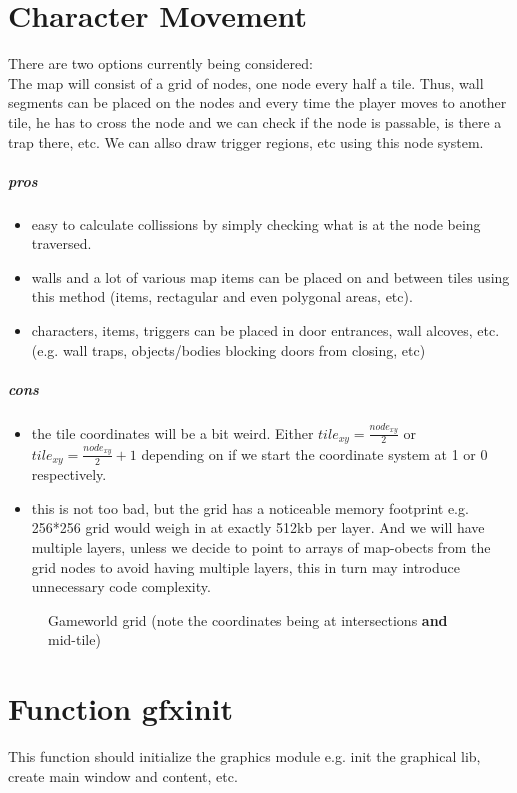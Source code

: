 \documentclass[a4paper,10pt]{book}
\begin{document}
\section{Character Movement}
There are two options currently being considered: \\
The map will consist of a grid of nodes, one node every half a tile. Thus,
wall segments can be placed on the nodes and every time the player moves to
another tile, he has to cross the node and we can check if the node is passable,
is there a trap there, etc. We can allso draw trigger regions, etc using this
node system.
\subparagraph{pros}
\begin{itemize}
  \item easy to calculate collissions by simply checking what is at the node
    being traversed.
  \item walls and a lot of various map items can be placed on and between tiles
    using this method (items, rectagular and even polygonal areas, etc).
  \item characters, items, triggers can be placed in door entrances, wall
    alcoves, etc. (e.g. wall traps, objects/bodies blocking doors from closing,
    etc)
\end{itemize}
\subparagraph{cons}
\begin{itemize}
  \item the tile coordinates will be a bit weird. Either $\displaystyle
    tile_{xy} = \frac{node_{xy}}{2}$ or $\displaystyle tile_{xy} =
    \frac{node_{xy}}{2} + 1$ depending on if we start the coordinate system
    at 1 or 0 respectively.
  \item this is not too bad, but the grid has a noticeable memory footprint
    e.g. 256*256 grid would weigh in at exactly 512kb per layer. And we will
    have multiple layers, unless we decide to point to arrays of map-obects
    from the grid nodes to avoid having multiple layers, this in turn may
    introduce unnecessary code complexity.
\end{itemize}
\begin{figure}
  \caption{Gameworld grid (note the coordinates being at intersections
    \textbf{and} mid-tile)}
\end{figure}
\section{Function \enginenamespace{}gfxinit}
This function should initialize the graphics module e.g. init the graphical lib,
create main window and content, etc.
\end{document}
